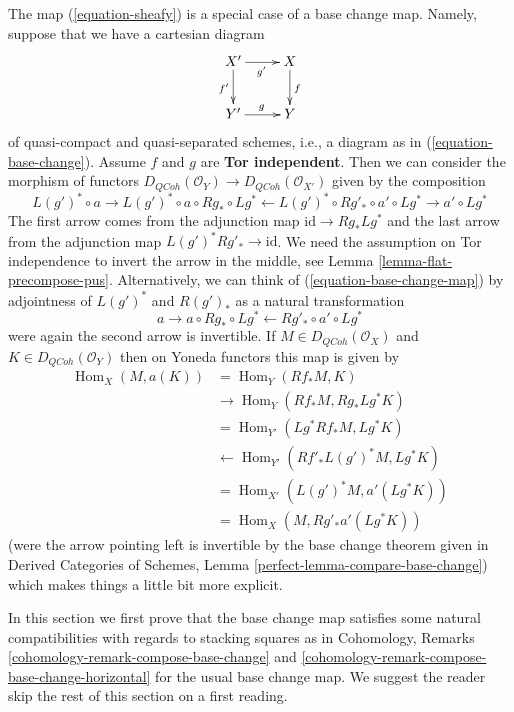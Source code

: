 \documentclass{stacks-project}
\theoremstyle{plain}
\theoremstyle{definition}
\theoremstyle{remark}
\numberwithin{equation}{subsection}
\def\Hom{\mathop{\mathrm{Hom}}\nolimits}
\def\QCoh{\mathit{QCoh}}
\begin{document}
\noindent
The map (\ref{equation-sheafy}) is a special case of a base change map.
Namely, suppose that we have a cartesian diagram
$$
\xymatrix{
X' \ar[r]_{g'} \ar[d]_{f'} & X \ar[d]^f \\
Y' \ar[r]^g & Y
}
$$
of quasi-compact and quasi-separated schemes, i.e., a diagram as in
(\ref{equation-base-change}). Assume $f$ and $g$ are {\bf Tor independent}.
Then we can consider the morphism of functors
$D_\QCoh(\mathcal{O}_Y) \to D_\QCoh(\mathcal{O}_{X'})$
given by the composition
\begin{equation}
\label{equation-base-change-map}
L(g')^* \circ a \to
L(g')^* \circ a \circ Rg_* \circ Lg^* \leftarrow
L(g')^* \circ Rg'_* \circ a' \circ Lg^* \to a' \circ Lg^*
\end{equation}
The first arrow comes from the adjunction map $\text{id} \to Rg_* Lg^*$
and the last arrow from the adjunction map $L(g')^*Rg'_* \to \text{id}$.
We need the assumption on Tor independence to invert the arrow
in the middle, see Lemma \ref{lemma-flat-precompose-pus}.
Alternatively, we can think of (\ref{equation-base-change-map}) by
adjointness of $L(g')^*$ and $R(g')_*$ as a natural transformation
$$
a \to a \circ Rg_* \circ Lg^* \leftarrow Rg'_* \circ a' \circ Lg^*
$$
were again the second arrow is invertible. If $M \in D_\QCoh(\mathcal{O}_X)$
and $K \in D_\QCoh(\mathcal{O}_Y)$
then on Yoneda functors this map is given by
\begin{align*}
\Hom_X(M, a(K))
& =
\Hom_Y(Rf_*M, K) \\
& \to
\Hom_Y(Rf_*M, Rg_* Lg^*K) \\
& =
\Hom_{Y'}(Lg^*Rf_*M, Lg^*K) \\
& \leftarrow
\Hom_{Y'}(Rf'_* L(g')^*M, Lg^*K) \\
& =
\Hom_{X'}(L(g')^*M, a'(Lg^*K)) \\
& =
\Hom_X(M, Rg'_*a'(Lg^*K))
\end{align*}
(were the arrow pointing left is invertible by the base
change theorem given in
Derived Categories of Schemes, Lemma \ref{perfect-lemma-compare-base-change})
which makes things a little bit more explicit.

\medskip\noindent
In this section we first prove that the base change map satisfies
some natural compatibilities with regards to stacking squares as in
Cohomology, Remarks \ref{cohomology-remark-compose-base-change} and
\ref{cohomology-remark-compose-base-change-horizontal} for the usual
base change map. We suggest the reader skip the rest of this section
on a first reading.
\end{document}
